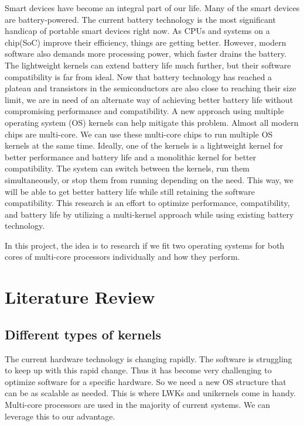 \documentclass[11pt]{article}       %
\begin{document}
Smart devices have become an integral part of our life. Many of the smart devices are battery-powered. The current battery technology is the most significant handicap of portable smart devices right now. As CPUs and systems on a chip(SoC) improve their efficiency, things are getting better. However, modern software also demands more processing power, which faster drains the battery. The lightweight kernels can extend battery life much further, but their software compatibility is far from ideal. Now that battery technology has reached a plateau and transistors in the semiconductors are also close to reaching their size limit, we are in need of an alternate way of achieving better battery life without compromising performance and compatibility. A new approach using multiple operating system (OS) kernels can help mitigate this problem. Almost all modern chips are multi-core. We can use these multi-core chips to run multiple OS kernels at the same time. Ideally, one of the kernels is a lightweight kernel for better performance and battery life and a monolithic kernel for better compatibility. The system can switch between the kernels, run them simultaneously, or stop them from running depending on the need. This way, we will be able to get better battery life while still retaining the software compatibility. This research is an effort to optimize performance, compatibility, and battery life by utilizing a multi-kernel approach while using existing battery technology. 

In this project, the idea is to research if we fit two operating systems for both cores of multi-core processors individually and how they perform.

\section{Literature Review} \label{litrev}

\subsection{Different types of kernels}
The current hardware technology is changing rapidly. The software is struggling to keep up with this rapid change. Thus it has become very challenging to optimize software for a specific hardware\cite{DEL02}. So we need a new OS structure that can be as scalable as needed. This is where LWKs and unikernels come in handy. Multi-core processors are used in the majority of current systems. We can leverage this to our advantage.\\
\end{document}
